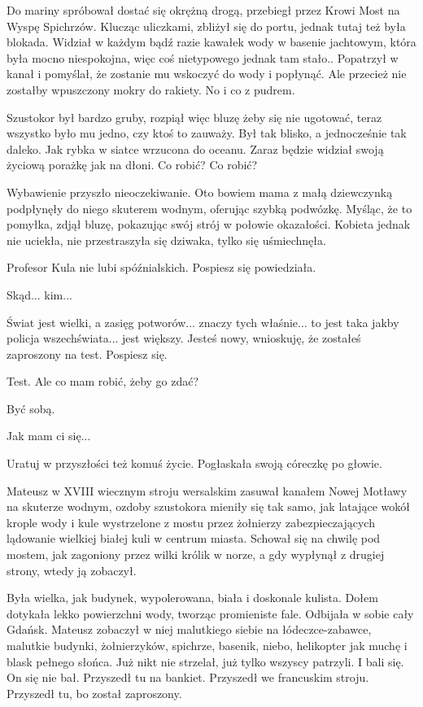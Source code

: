 Do mariny spróbował dostać się okrężną drogą, przebiegł przez Krowi Most na Wyspę Spichrzów.
Klucząc uliczkami, zbliżył się do portu, jednak tutaj też była blokada.
Widział w każdym bądź razie kawałek wody w basenie jachtowym, która była mocno niespokojna, więc coś nietypowego jednak tam stało..
Popatrzył w kanał i pomyślał, że zostanie mu wskoczyć do wody i popłynąć.
Ale przecież nie zostałby wpuszczony mokry do rakiety.
No i co z pudrem.

Szustokor był bardzo gruby, rozpiął więc bluzę żeby się nie ugotować, teraz wszystko było mu jedno, czy ktoś to zauważy.
Był tak blisko, a jednocześnie tak daleko.
Jak rybka w siatce wrzucona do oceanu.
Zaraz będzie widział swoją życiową porażkę jak na dłoni.
Co robić? Co robić?

Wybawienie przyszło nieoczekiwanie.
Oto bowiem mama z małą dziewczynką podpłynęły do niego skuterem wodnym, oferując szybką podwózkę.
Myśląc, że to pomyłka, zdjął bluzę, pokazując swój strój w połowie okazałości.
Kobieta jednak nie uciekła, nie przestraszyła się dziwaka, tylko się uśmiechnęła.

\ds{} Profesor Kula nie lubi spóźnialskich. Pospiesz się \dm{} powiedziała. \de{}

\ds{} Skąd... kim... \de{}

\ds{} Świat jest wielki, a zasięg potworów... znaczy tych właśnie... to jest taka jakby policja wszechświata... jest większy.
Jesteś nowy, wnioskuję, że zostałeś zaproszony na test. Pospiesz się.\de{}

\ds{} Test. Ale co mam robić, żeby go zdać? \de{}

\ds{} Być sobą. \de{}

\ds{} Jak mam ci się... \de{}

\ds{} Uratuj w przyszłości też komuś życie. \dm{} Pogłaskała swoją córeczkę po głowie. \de{}

Mateusz w XVIII wiecznym stroju wersalskim zasuwał kanałem Nowej Motławy na skuterze wodnym, ozdoby szustokora mieniły się tak samo, jak latające wokół
krople wody i kule wystrzelone z mostu przez żołnierzy zabezpieczających
lądowanie wielkiej białej kuli w centrum miasta.
Schował się na chwilę pod mostem, jak zagoniony przez wilki królik w norze, a gdy wypłynął z drugiej strony, wtedy ją zobaczył.

Była wielka, jak budynek, wypolerowana, biała i doskonale kulista.
Dołem dotykała lekko powierzchni wody, tworząc promieniste fale.
Odbijała w sobie cały Gdańsk.
Mateusz zobaczył w niej malutkiego siebie na łódeczce-zabawce, malutkie budynki, żołnierzyków, spichrze, basenik, niebo, helikopter jak muchę i blask pełnego słońca.
Już nikt nie strzelał, już tylko wszyscy patrzyli. I bali się.
On się nie bał. Przyszedł tu na bankiet.
Przyszedł we francuskim stroju.
Przyszedł tu, bo został zaproszony.


